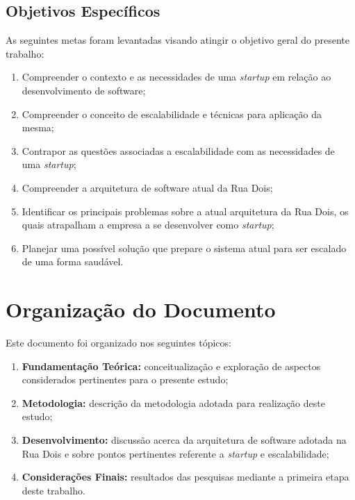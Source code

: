 \subsection{Objetivos Específicos}

As seguintes metas foram levantadas visando atingir o objetivo geral do presente
trabalho:

  \begin{enumerate}
    \item Compreender o contexto e as necessidades de uma \textit{startup} em
    relação ao desenvolvimento de software;
    \item Compreender o conceito de escalabilidade e técnicas para aplicação
    da mesma;
    \item Contrapor as questões associadas a escalabilidade com as necessidades
    de uma \textit{startup};
    \item Compreender a arquitetura de software atual da Rua Dois;
    \item Identificar os principais problemas sobre a atual arquitetura da Rua
    Dois, os quais atrapalham a empresa a se desenvolver como \textit{startup};
    \item Planejar uma possível solução que prepare o sistema atual para ser
    escalado de uma forma saudável.
  \end{enumerate}

\section{Organização do Documento}

Este documento foi organizado nos seguintes tópicos:

  \begin{enumerate}
    \item \textbf{Fundamentação Teórica:} conceitualização e exploração de
    aspectos considerados pertinentes para o presente estudo;
    \item \textbf{Metodologia:} descrição da metodologia adotada para
    realização deste estudo;
    \item \textbf{Desenvolvimento:} discussão acerca da arquitetura de
    software adotada na Rua Dois e sobre pontos pertinentes referente a
    \textit{startup} e escalabilidade;
    \item \textbf{Considerações Finais:} resultados das pesquisas mediante a
    primeira etapa deste trabalho.
  \end{enumerate}
